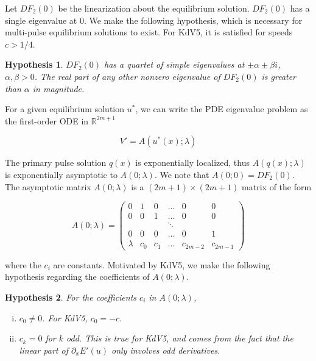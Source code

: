 \documentclass[12pt]{article}
\def\R{{\mathbb R}}
\newtheorem{hypothesis}{Hypothesis}
\begin{document}
Let $D F_2(0)$ be the linearization about the equilibrium solution. $D F_2(0)$ has a single eigenvalue at 0. We make the following hypothesis, which is necessary for multi-pulse equilibrium solutions to exist. For KdV5, it is satisfied for speeds $c > 1/4$.

\begin{hypothesis}\label{quartet}
$D F_2(0)$ has a quartet of simple eigenvalues at $\pm \alpha \pm \beta i$, $\alpha, \beta > 0$. The real part of any other nonzero eigenvalue of $D F_2(0)$ is greater than $\alpha$ in magnitude.
\end{hypothesis}

For a given equilibrium solution $u^*$, we can write the PDE eigenvalue problem as the first-order ODE in $\R^{2m+1}$

\begin{equation}
V' = A(u^*(x); \lambda)
\end{equation}

The primary pulse solution $q(x)$ is exponentially localized, thus $A(q(x); \lambda)$ is exponentially asymptotic to $A(0; \lambda)$. We note that $A(0; 0) = D F_2(0)$. The asymptotic matrix $A(0; \lambda)$ is a $(2m + 1) \times (2m + 1)$ matrix of the form

\begin{equation}
A(0; \lambda) = \begin{pmatrix}
0 & 1 & 0 & \dots & 0 & 0 \\
0 & 0 & 1 & \dots & 0 & 0 \\
& & & \ddots & & \\
0 & 0 & 0 & \dots & 0 & 1 \\
\lambda & c_0 & c_1 & \dots & c_{2m-2} & c_{2m-1}
\end{pmatrix}
\end{equation}

where the $c_i$ are constants. Motivated by KdV5, we make the following hypothesis regarding the coefficients of $A(0; \lambda)$.

\begin{hypothesis}\label{A0coeffs}
For the coefficients $c_i$ in $A(0; \lambda)$,
\begin{enumerate}[(i)]
\item $c_0 \neq 0$. For KdV5, $c_0 = -c$.
\item $c_k = 0$ for $k$ odd. This is true for KdV5, and comes from the fact that the linear part of $\partial_x E'(u)$ only involves odd derivatives. 
\end{enumerate}
\end{hypothesis}
\end{document}
